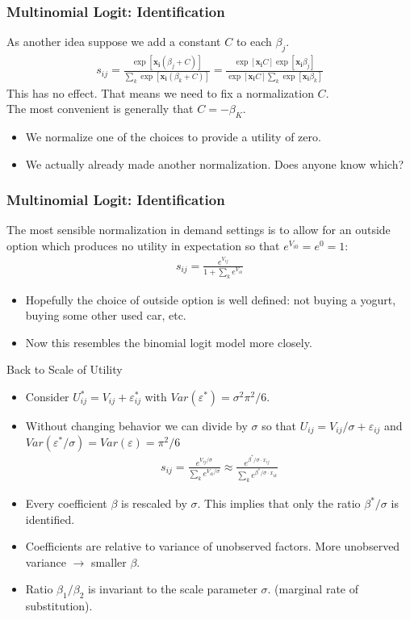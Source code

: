\documentclass[xcolor=pdftex,dvipsnames,table,mathserif,aspectratio=169]{beamer}
\begin{document}
\begin{frame}
\frametitle{Multinomial Logit: Identification}
As another idea suppose we add a constant $C$ to each $\beta_j$.
\begin{eqnarray*}
s_{ij} = \frac{\exp[\mathbf{x_i} (\beta_j+C) ]}{\sum_k \exp[\mathbf{x_i} (\beta_k+C) ]} =  \frac{\exp[\mathbf{x_i} C] \exp[\mathbf{x_i} \beta_j ]}{\exp[\mathbf{x_i} C] \sum_k \exp[\mathbf{x_i} \beta_k ]}
\end{eqnarray*}
This has no effect.  That means we need to fix a normalization $C$.\\
 The most convenient is generally that $C = - \beta_K$.
\begin{itemize}
\item We normalize one of the choices to provide a utility of zero.
\item We actually already made another normalization. Does anyone know which?
\end{itemize}
\end{frame}


\begin{frame}
\frametitle{Multinomial Logit: Identification}
The most sensible normalization in demand settings is to allow for an \alert{outside option} which produces no utility in expectation so that $e^{V_{i0}} = e^{0}=1$:
\begin{eqnarray*}
s_{ij} = \frac{e^{V_{ij} }}{1+\sum_k e^{V_{ik} }}
\end{eqnarray*}
\begin{itemize}
\item Hopefully the choice of outside option is well defined: not buying a yogurt, buying some other used car, etc.
\item Now this resembles the binomial logit model more closely.
\end{itemize}
\end{frame}


\begin{frame}{Back to Scale of Utility}
\begin{itemize}
\item Consider $U_{ij}^{*} = V_{ij} + \varepsilon_{ij}^{*}$ with $Var(\varepsilon^{*}) = \sigma^2 \pi^2/6$.
\item Without changing behavior we can divide by $\sigma$ so that $U_{ij} = V_{ij}/\sigma + \varepsilon_{ij}$ and $Var(\varepsilon^{*}/\sigma)=Var(\varepsilon) = \pi^2/6$
\begin{eqnarray*}
s_{ij} = \frac{e^{V_{ij}/\sigma}}{\sum_k e^{V_{ik}/\sigma}} \approx \frac{e^{\beta^{*}/\sigma \cdot x_{ij}}}{\sum_k e^{\beta^{*}/\sigma \cdot x_{ik}}}
\end{eqnarray*}
\item Every coefficient $\beta$ is rescaled by $\sigma$. This implies that only the ratio $\beta^{*}/\sigma$ is identified.
\item Coefficients are relative to variance of unobserved factors. More unobserved variance $\longrightarrow$ smaller $\beta$.
\item Ratio $\beta_1/\beta_2$ is invariant to the scale parameter $\sigma$. (\alert{marginal rate of substitution}).
\end{itemize}
\end{frame}
\end{document}
